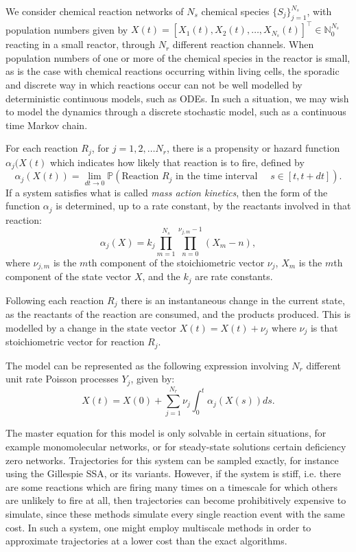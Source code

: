 \documentclass[final]{siamltex}
\begin{document}
We consider chemical reaction networks of $N_s$ chemical species $\{S_j\}_{j=1}^{N_s}$,
with population numbers given by $X(t) = [X_1(t), X_2(t), \ldots, X_{N_s}(t)]^\top \in
\mathbb{N}_0^{N_s}$ reacting in a small reactor, through $N_r$ different reaction
channels. When population numbers of one or more of the chemical
species in the reactor is small, as is the case with chemical
reactions occurring within living cells, the sporadic and discrete way
in which reactions occur can not be well modelled by deterministic
continuous models, such as ODEs. In such a situation, we may wish to
model the dynamics through a discrete stochastic model, such as a
continuous time Markov chain.

For each reaction $R_j$, for $j = 1,2,\ldots N_r$, there is a
propensity or hazard function $\alpha_j(X(t)$ which indicates how
likely that reaction is to fire, defined by
\[\alpha_j(X(t)) = \lim_{dt \to 0} \mathbb{P}(\text{Reaction $R_j$ in
    the time interval  } \quad s \in [t, t+ dt] ).\] If a system
satisfies what is called \emph{mass action kinetics}, then the form of
the function $\alpha_j$ is determined, up to a rate constant, by the
reactants involved in that reaction:
\begin{equation}\label{eq:MAK}
\alpha_j(X) = k_j \prod_{m=1}^{N_s} \prod_{n=0}^{\nu_{j,m} -1} (X_m - n),
\end{equation}
where $\nu_{j,m}$ is the $m$th component of the stoichiometric vector
$\nu_j$, $X_m$ is the $m$th component of the state vector $X$, and the
$k_j$ are rate constants.

Following each reaction $R_j$ there is an instantaneous change in the
current state, as the reactants of the reaction are consumed, and the
products produced. This is modelled by a change in the state vector
$X(t) = X(t) + \nu_j$ where $\nu_j$ is that stoichiometric vector for
reaction $R_j$.

The model can be represented as the following expression involving
$N_r$ different unit rate Poisson
processes\cite{anderson2011continuous} $Y_j$, given by:
\begin{equation}\label{eq:RTC}
X(t) = X(0) + \sum_{j=1}^{N_r} \nu_j \int_0^t \alpha_j(X(s)) ds.
\end{equation}

The master equation for this model is only solvable in certain
situations, for example monomolecular networks\cite{jahnke2007solving}, or for
steady-state solutions certain deficiency
zero networks\cite{anderson2010product,anderson2016product}. Trajectories for this system can be
sampled exactly, for instance using the Gillespie SSA\cite{gillespie1977exact}, or
its variants\cite{gillespie2007stochastic,cao2004efficient,anderson2007modified}. However, if the system is stiff, i.e. there
are some reactions which are firing many times on a timescale for
which others are unlikely to fire at all, then trajectories can become
prohibitively expensive to simulate, since these methods simulate
every single reaction event with the same cost. In such a system, one
might employ multiscale methods in order to approximate trajectories
at a lower cost than the exact algorithms.
\end{document}
